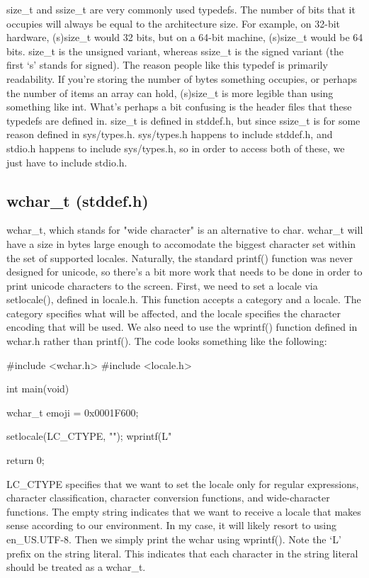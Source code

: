 \documentclass{article}
\begin{document}
size\_t and ssize\_t are very commonly used typedefs. The number of bits that it occupies will always be equal
to the architecture size. For example, on 32-bit hardware, (s)size\_t would 32 bits, but on a 64-bit machine,
(s)size\_t would be 64 bits. size\_t is the unsigned variant, whereas ssize\_t is the signed variant (the first
‘s’ stands for signed). The reason people like this typedef is primarily readability. If you’re storing the
number of bytes something occupies, or perhaps the number of items an array can hold, (s)size\_t is more
legible than using something like int. What’s perhaps a bit confusing is the header files that these typedefs
are defined in. size\_t is defined in stddef.h, but since ssize\_t is for some reason defined in sys/types.h.
sys/types.h happens to include stddef.h, and stdio.h happens to include sys/types.h, so in order to access both
of these, we just have to include stdio.h.

\subsection{wchar\_t (stddef.h)}

wchar\_t, which stands for "wide character" is an alternative to char. wchar\_t will have a size in bytes
large enough to accomodate the biggest character set within the set of supported locales. Naturally, the
standard printf() function was never designed for unicode, so there’s a bit more work that needs to be done
in order to print unicode characters to the screen. First, we need to set a locale via setlocale(), defined in
locale.h. This function accepts a category and a locale. The category specifies what will be affected, and the
locale specifies the character encoding that will be used. We also need to use the wprintf() function defined
in wchar.h rather than printf(). The code looks something like the following:

\begin{clst}
#include <wchar.h>
#include <locale.h>

int main(void) {
    wchar_t emoji = 0x0001F600;

    setlocale(LC_CTYPE, "");
    wprintf(L"%

    return 0;
}
\end{clst}

LC\_CTYPE specifies that we want to set the locale only for regular expressions, character classification,
character conversion functions, and wide-character functions. The empty string indicates that we want to
receive a locale that makes sense according to our environment. In my case, it will likely resort to using
en\_US.UTF-8. Then we simply print the wchar using wprintf(). Note the ‘L’ prefix on the string literal. This
indicates that each character in the string literal should be treated as a wchar\_t.
\end{document}
